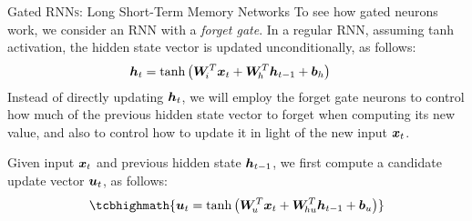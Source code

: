 %
%
\begin{frame}{Gated RNN\textsc{s}: Long Short-Term Memory Networks}
To see how gated neurons work, we consider an RNN with a {\em forget
gate}. 
%
%
In a regular RNN, assuming tanh activation, the hidden state vector is updated unconditionally, as
follows:
\begin{align*}
    {\boldsymbol h}_t & = \tanh\left( {\boldsymbol W}_{\!i}^T {\boldsymbol x}_t + {\boldsymbol W}_{\!h}^T {\boldsymbol h}_{t-1} +
    {\boldsymbol b}_{h} \right)
\end{align*}
Instead of directly updating ${\boldsymbol h}_t$, we will employ the 
forget gate neurons to control how much of
the previous hidden state vector to forget when computing its new value, 
and also to control how to update it in
light of the new input ${\boldsymbol x}_t$.

%
Given input ${\boldsymbol x}_t$ and previous hidden state
${\boldsymbol h}_{t-1}$, we first compute a candidate update
vector ${\boldsymbol u}_t$, as follows:
\begin{align}
    \tcbhighmath{
    \bu_t  = \tanh\lB( \bW_{\!u}^T \bx_t + \bW_{\!hu}^T \bh_{t-1} +
\bb_{u} \rB)}
\end{align}
%
\end{frame}

